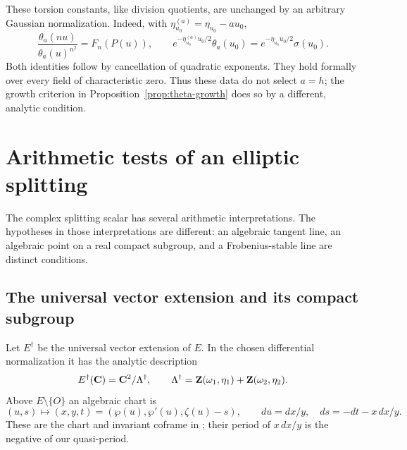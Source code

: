 \documentclass[11pt]{article}
\theoremstyle{definition}\newtheorem{definition}[theorem]{Definition}
\theoremstyle{remark}\newtheorem{remark}[theorem]{Remark}
\begin{document}
These torsion constants, like division quotients, are unchanged by an arbitrary Gaussian normalization. Indeed, with
$\eta^{(a)}_{u_0}=\eta_{u_0}-au_0$,
\[
 \frac{\theta_a(nu)}{\theta_a(u)^{n^2}}=F_n(P(u)),\qquad
 e^{-\eta^{(a)}_{u_0}u_0/2}\theta_a(u_0)
       =e^{-\eta_{u_0}u_0/2}\sigma(u_0).
\]
Both identities follow by cancellation of quadratic exponents. They hold formally over every field of characteristic zero. Thus these data do not select $a=h$; the growth criterion in Proposition~\ref{prop:theta-growth} does so by a different, analytic condition.

\section{Arithmetic tests of an elliptic splitting}\label{sec:elliptic-arithmetic}
The complex splitting scalar has several arithmetic interpretations. The hypotheses in those interpretations are different: an algebraic tangent line, an algebraic point on a real compact subgroup, and a Frobenius-stable line are distinct conditions.

\subsection{The universal vector extension and its compact subgroup}
Let $E^\dagger$ be the universal vector extension of $E$. In the chosen differential normalization it has the analytic description
\[
 E^\dagger(\mathbf C)=\mathbf C^2/\Lambda^\dagger,\qquad
 \Lambda^\dagger=\mathbf Z(\omega_1,\eta_1)+\mathbf Z(\omega_2,\eta_2).
\]
Above $E\setminus\{O\}$ an algebraic chart is
\[
 (u,s)\longmapsto(x,y,t)=(\wp(u),\wp'(u),\zeta(u)-s),\qquad
 du=dx/y,\quad ds=-dt-x\,dx/y.
\]
These are the chart and invariant coframe in \cite[Sections 4.1--4.2, (4.1) and Proposition 4.2, pp.~7--8]{FonsecaMatthes}; their period of $x\,dx/y$ is the negative of our quasi-period.
\end{document}
